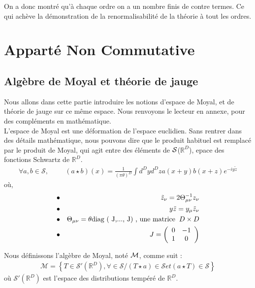 \documentclass[a4paper,11pt]{article} %
\theoremstyle{plain}
\theoremstyle{definition}
\theoremstyle{remark}
\numberwithin{equation}{section}
\numberwithin{equation}{subsection}
\numberwithin{figure}{section}
\begin{document}
\noindent
On a donc montré qu'à chaque ordre on a un nombre finis de contre termes. Ce qui achève la démonstration de la renormalisabilité de la théorie
à tout les ordres.  


\section{Apparté Non Commutative}

  \subsection{Algèbre de Moyal et théorie de jauge}

\noindent
Nous allons dans cette partie introduire les notions d'espace de Moyal, et de théorie de jauge sur ce même espace. Nous renvoyons le lecteur en 
annexe, pour des compléments en mathématique.\\

\noindent
L'espace de Moyal est une déformation de l'espace euclidien. Sans rentrer dans des détails mathématique, nous pouvons dire que le produit habituel 
est remplacé par le produit de Moyal, qui agit entre des éléments de $\cal{S}$($\mathbb{R}^{D}$), epace des fonctions Schwartz de $\mathbb{R}^{D}$.
\begin{eqnarray*}
 \forall a,b \in \mathcal{S} , \hspace{1cm}  (a \star b) (x)  = \frac{1}{(\pi \theta)^{D}}  \int  d^{D}y    d^{D}z   a(x+y)   b(x+z)   
e^{-i y \tilde{z} }
\end{eqnarray*}
où,
\begin{eqnarray*}
 &\bullet&  \tilde{z}_{\nu}  =  2 \Theta^{-1}_{\mu \nu} z_{\nu}  \\
 &\bullet&  y \tilde{z} = y_{\mu}  \tilde{z}_{\nu}  \\
 &\bullet&  \Theta_{\mu \nu}  =  \theta  \text{diag ( J,..., J) , une matrice} \hspace{2mm} D \times D  \\
 &\bullet&  J = 
\left(
  \begin{array}{ c c }
     0 & -1 \\
     1 & 0
  \end{array} 
\right)
\end{eqnarray*}

\noindent
Nous définissons l'algèbre de Moyal, noté $\cal{M}$, comme suit :
\begin{eqnarray*}
 \mathcal{M}  =  \left \{ \right. T \in \mathcal{S}'(\mathbb{R}^{D}) ,  \forall \in \mathcal{S} /  (T \star  a) \in \mathcal{S}   
et (a \star  T) \in \mathcal{S} \left.  \right \}
\end{eqnarray*}
où  $\mathcal{S}'(\mathbb{R}^{D})$ est l'espace des distributions tempéré de $\mathbb{R}^{D}$.\\
\end{document}
